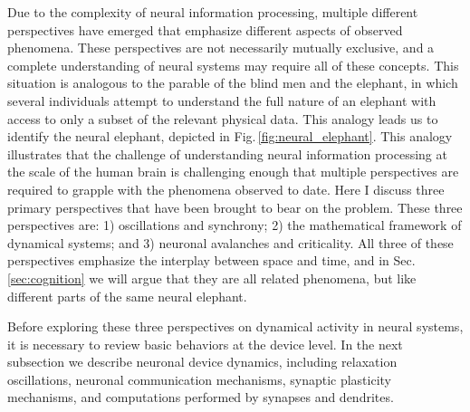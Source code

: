 \documentclass[twocolumn]{article}
\begin{document}
Due to the complexity of neural information processing, multiple different perspectives have emerged that emphasize different aspects of observed phenomena. These perspectives are not necessarily mutually exclusive, and a complete understanding of neural systems may require all of these concepts. This situation is analogous to the parable of the blind men and the elephant, in which several individuals attempt to understand the full nature of an elephant with access to only a subset of the relevant physical data. This analogy leads us to identify the neural elephant, depicted in Fig.\,\ref{fig:neural_elephant}. This analogy illustrates that the challenge of understanding neural information processing at the scale of the human brain is challenging enough that multiple perspectives are required to grapple with the phenomena observed to date. Here I discuss three primary perspectives that have been brought to bear on the problem. These three perspectives are: 1) oscillations and synchrony; 2) the mathematical framework of dynamical systems; and 3) neuronal avalanches and criticality. All three of these perspectives emphasize the interplay between space and time, and in Sec.\,\ref{sec:cognition} we will argue that they are all related phenomena, but like different parts of the same neural elephant.

Before exploring these three perspectives on dynamical activity in neural systems, it is necessary to review basic behaviors at the device level. In the next subsection we describe neuronal device dynamics, including relaxation oscillations, neuronal communication mechanisms, synaptic plasticity mechanisms, and computations performed by synapses and dendrites. 
\end{document}
